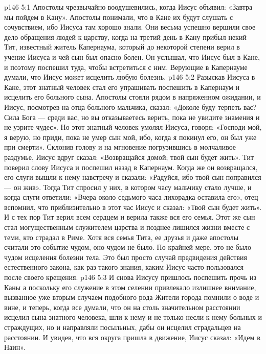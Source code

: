 \vs p146 5:1 Апостолы чрезвычайно воодушевились, когда Иисус объявил: «Завтра мы пойдем в Кану». Апостолы понимали, что в Кане их будут слушать с сочувствием, ибо Иисуса там хорошо знали. Они весьма успешно вершили свое дело обращения людей к царству, когда на третий день в Кану прибыл некий Тит, известный житель Капернаума, который до некоторой степени верил в учение Иисуса и чей сын был опасно болен. Он услышал, что Иисус был в Кане, и поэтому поспешил туда, чтобы встретиться с ним. Верующие в Капернауме думали, что Иисус может исцелить любую болезнь.
\vs p146 5:2 Разыскав Иисуса в Кане, этот знатный человек стал его упрашивать поспешить в Капернаум и исцелить его больного сына. Апостолы стояли рядом в напряженном ожидании, и Иисус, посмотрев на отца больного мальчика, сказал: «Доколе буду терпеть вас? Сила Бога --- среди вас, но вы отказываетесь верить, пока не увидите знамения и не узрите чудес». Но этот знатный человек умолял Иисуса, говоря: «Господи мой, я верую, но приди, пока не умер сын мой, ибо, когда я покинул его, он был уже при смерти». Склонив голову и на мгновение погрузившись в молчаливое раздумье, Иисус вдруг сказал: «Возвращайся домой; твой сын будет жить». Тит поверил слову Иисуса и поспешил назад в Капернаум. Когда же он возвращался, его слуги вышли к нему навстречу и сказали: «Радуйся, ибо твой сын поправился --- он жив». Тогда Тит спросил у них, в котором часу мальчику стало лучше, и когда слуги ответили: «Вчера около седьмого часа лихорадка оставила его», отец вспомнил, что приблизительно в этот час Иисус и сказал: «Твой сын будет жить». И с тех пор Тит верил всем сердцем и верила также вся его семья. Этот же сын стал могущественным служителем царства и позднее лишился жизни вместе с теми, кто страдал в Риме. Хотя вся семья Тита, ее друзья и даже апостолы считали это событие чудом, оно чудом не было. По крайней мере, это не было чудом исцеления болезни тела. Это был просто случай предвидения действия естественного закона, как раз такого знания, каким Иисус часто пользовался после своего крещения.
\vs p146 5:3 И снова Иисусу пришлось поспешить прочь из Каны а поскольку его служение в этом селении привлекало излишнее внимание, вызванное уже вторым случаем подобного рода Жители города помнили о воде и вине, и теперь, когда все думали, что он на столь значительном расстоянии исцелил сына знатного человека, шли к нему и не только несли к нему больных и страждущих, но и направляли посыльных, дабы он исцелил страдальцев на расстоянии. И увидев, что вся округа пришла в движение, Иисус сказал: «Идем в Наин».
